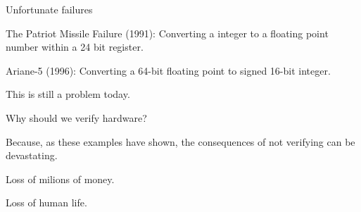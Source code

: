 \documentclass[11pt]{beamer}
\begin{document}
\begin{frame}{Unfortunate failures}

  \begin{block}{}
     The Patriot Missile Failure (1991): Converting a integer to a floating point number within a 24 bit register.
  \end{block}

  \pause

  \begin{block}{}
    Ariane-5 (1996): Converting a 64-bit floating point to signed 16-bit integer.
  \end{block}

  \pause

  \begin{block}{}
    This is still a problem today.
  \end{block}


\end{frame}


\begin{frame}{Why should we verify hardware?}
    \begin{block}{}
        Because, as these examples have shown, the consequences of not verifying can be devastating.
            \vspace{5mm}

        Loss of milions of money.
            \vspace{5mm}

        Loss of human life.
    \end{block}
\end{frame}
\end{document}
